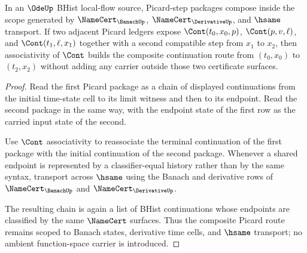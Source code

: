 \begin{theorem}
\label{thm:ode-root-picard-continuation-scope}
In an $\OdeUp$ BHist local-flow source, Picard-step packages compose inside
the scope generated by $\NameCert_{\BanachUp}$, $\NameCert_{\DerivativeUp}$,
and $\hsame$ transport. If two adjacent Picard ledgers expose
$\Cont(t_0,x_0,p)$, $\Cont(p,v,\ell)$, and $\Cont(t_1,\ell,x_1)$ together with
a second compatible step from $x_1$ to $x_2$, then associativity of $\Cont$
builds the composite continuation route from $(t_0,x_0)$ to $(t_2,x_2)$
without adding any carrier outside those two certificate surfaces.
\end{theorem}
\begin{proof}
Read the first Picard package as a chain of displayed continuations from the
initial time-state cell to its limit witness and then to its endpoint. Read
the second package in the same way, with the endpoint state of the first row
as the carried input state of the second.

Use $\Cont$ associativity to reassociate the terminal continuation of the
first package with the initial continuation of the second package. Whenever a
shared endpoint is represented by a classifier-equal history rather than by
the same syntax, transport across $\hsame$ using the Banach and derivative
rows of $\NameCert_{\BanachUp}$ and $\NameCert_{\DerivativeUp}$.

The resulting chain is again a list of BHist continuations whose endpoints are
classified by the same $\NameCert$ surfaces. Thus the composite Picard route
remains scoped to Banach states, derivative time cells, and $\hsame$
transport; no ambient function-space carrier is introduced.
\end{proof}

